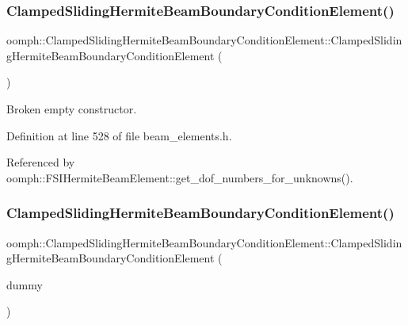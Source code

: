 \subsubsection{\texorpdfstring{Clamped\+Sliding\+Hermite\+Beam\+Boundary\+Condition\+Element()}{ClampedSlidingHermiteBeamBoundaryConditionElement()}\hspace{0.1cm}{\footnotesize\ttfamily [2/3]}}
{\footnotesize\ttfamily oomph\+::\+Clamped\+Sliding\+Hermite\+Beam\+Boundary\+Condition\+Element\+::\+Clamped\+Sliding\+Hermite\+Beam\+Boundary\+Condition\+Element (\begin{DoxyParamCaption}{ }\end{DoxyParamCaption})\hspace{0.3cm}{\ttfamily [inline]}}



Broken empty constructor. 



Definition at line 528 of file beam\+\_\+elements.\+h.



Referenced by oomph\+::\+F\+S\+I\+Hermite\+Beam\+Element\+::get\+\_\+dof\+\_\+numbers\+\_\+for\+\_\+unknowns().

\mbox{\label{classoomph_1_1ClampedSlidingHermiteBeamBoundaryConditionElement_ac5648dea07535b922e25a4c578a4f8c4}} 
\subsubsection{\texorpdfstring{Clamped\+Sliding\+Hermite\+Beam\+Boundary\+Condition\+Element()}{ClampedSlidingHermiteBeamBoundaryConditionElement()}\hspace{0.1cm}{\footnotesize\ttfamily [3/3]}}
{\footnotesize\ttfamily oomph\+::\+Clamped\+Sliding\+Hermite\+Beam\+Boundary\+Condition\+Element\+::\+Clamped\+Sliding\+Hermite\+Beam\+Boundary\+Condition\+Element (\begin{DoxyParamCaption}\item[{const \hyperlink{classoomph_1_1ClampedSlidingHermiteBeamBoundaryConditionElement}{Clamped\+Sliding\+Hermite\+Beam\+Boundary\+Condition\+Element} \&}]{dummy }\end{DoxyParamCaption})\hspace{0.3cm}{\ttfamily [inline]}}



